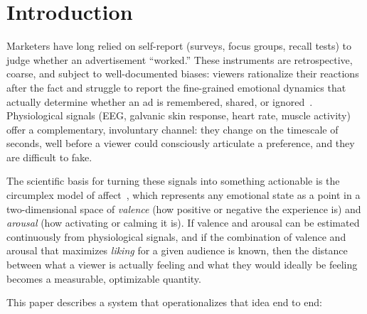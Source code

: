 \documentclass[conference]{IEEEtran}
\begin{document}
\section{Introduction}

Marketers have long relied on self-report (surveys, focus groups, recall
tests) to judge whether an advertisement ``worked.'' These instruments are
retrospective, coarse, and subject to well-documented biases: viewers
rationalize their reactions after the fact and struggle to report the
fine-grained emotional dynamics that actually determine whether an ad is
remembered, shared, or ignored~\cite{lee2007neuromarketing}. Physiological
signals (EEG, galvanic skin response, heart rate, muscle activity)
offer a complementary, involuntary channel: they change on the timescale of
seconds, well before a viewer could consciously articulate a preference,
and they are difficult to fake.

The scientific basis for turning these signals into something actionable is
the circumplex model of affect~\cite{russell1980circumplex}, which
represents any emotional state as a point in a two-dimensional space of
\emph{valence} (how positive or negative the experience is) and
\emph{arousal} (how activating or calming it is). If valence and arousal
can be estimated continuously from physiological signals, and if the
combination of valence and arousal that maximizes \emph{liking} for a given
audience is known, then the distance between what a viewer is actually
feeling and what they would ideally be feeling becomes a measurable,
optimizable quantity.

This paper describes a system that operationalizes that idea
end to end:
\end{document}
